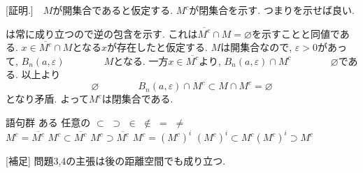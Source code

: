 \documentclass[dvipdfmx,a4paper,11pt]{article}
\newcommand{\R}{\mathbb{R}}
\theoremstyle{definition}
\begin{document}
 [証明.]　$M$が開集合であると仮定する. $M^c$が閉集合を示す. 
 つまり\boxed{\phantom{hogehoge}}を示せば良い. 
 
\boxed{\phantom{hogehoge}}は常に成り立つので逆の包含を示す.
これは$\overline{M^c} \cap M = \varnothing$を示すことと同値である. 
$x \in \overline{M^c} \cap M$となる$x$が存在したと仮定する.
$M$は開集合なので, \boxed{\phantom{hogehoge}}$\varepsilon >0$があって, $B_{n}(a, \varepsilon)\boxed{\phantom{hogehoge}}M$となる. 
一方$x \in \overline{M^c}$より, $B_{n}(a, \varepsilon) \cap M^c \boxed{\phantom{hogehoge}}\varnothing$である.
以上より
$$
\varnothing \boxed{\phantom{hogehoge}} B_{n}(a, \varepsilon) \cap M^c 
\subset M \cap M^c = \varnothing
$$
となり矛盾. 
よって$M^c$は閉集合である.
  
    \begin{itembox}[l]{語句群}
ある \quad 任意の  \quad  $\subset$ \quad $\supset$
\quad $\in$ \quad $\not\in$ \quad $=$ \quad $\neq$　 \\ 
$M^c = \overline{M^c}$ \quad $M^c \subset \overline{M^c}$ \quad$ M^c \supset \overline{M^c}$ \quad 
$M^c = (M^c)^i$ \quad $(M^c)^i \subset M^c $\quad$ (M^c)^i \supset M^c$
\end{itembox}


 [補足] 問題3,4の主張は後の距離空間でも成り立つ. 
 
\end{document}
